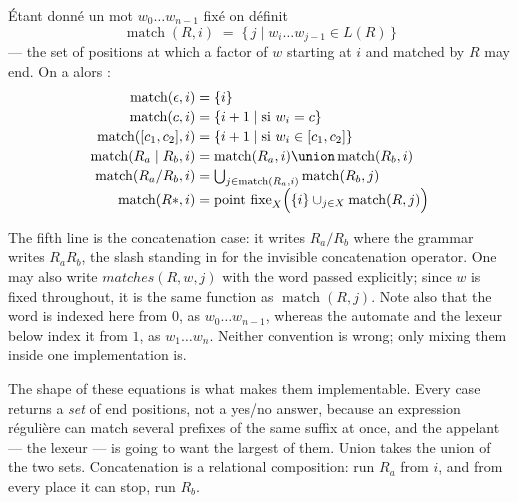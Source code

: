 \begin{definition}
  Étant donné un mot $w_0 \ldots w_{n-1}$ fixé on définit
  \[
    \operatorname{match}(R, i) \;=\; \{\, j \mid w_i \ldots w_{j-1} \in L(R) \,\}
  \]
  --- the set of positions at which a factor of $w$ starting at $i$ and matched
  by $R$ may end. On a alors :
  \[
    \begin{array}{r@{\;}c@{\;}l}
      \operatorname{match}(\epsilon, i)      &=& \{i\} \\[2pt]
      \operatorname{match}(c, i)             &=& \{ i+1 \mid \text{si } w_i = c \} \\[2pt]
      \operatorname{match}([c_1, c_2], i)    &=& \{ i+1 \mid \text{si } w_i \in [c_1, c_2] \} \\[2pt]
      \operatorname{match}(R_a \mid R_b, i)  &=& \operatorname{match}(R_a, i) \union \operatorname{match}(R_b, i) \\[2pt]
      \operatorname{match}(R_a / R_b, i)     &=& \bigcup_{j \in \operatorname{match}(R_a, i)} \operatorname{match}(R_b, j) \\[2pt]
      \operatorname{match}(R{*}, i)          &=& \text{point fixe}_X \Big( \{i\} \cup_{j \in X} \operatorname{match}(R, j) \Big)
    \end{array}
  \]
\end{definition}

\begin{notation}
  The fifth line is the concatenation case: it writes $R_a / R_b$ where the
  grammar writes $R_a R_b$, the slash standing in for the invisible
  concatenation operator. One may also write $\mathit{matches}(R, w, j)$ with
  the word passed explicitly; since $w$ is fixed throughout, it is the same
  function as $\operatorname{match}(R, j)$. Note also that the word is indexed
  here from $0$, as $w_0 \ldots w_{n-1}$, whereas the automate and the lexeur
  below index it from $1$, as $w_1 \ldots w_n$. Neither convention is wrong;
  only mixing them inside one implementation is.
\end{notation}

The shape of these equations is what makes them implementable. Every case
returns a \emph{set} of end positions, not a yes/no answer, because an
expression régulière can match several prefixes of the same suffix at once, and the appelant
--- the lexeur --- is going to want the largest of them. Union takes the union
of the two sets. Concatenation is a relational composition: run $R_a$ from $i$,
and from every place it can stop, run $R_b$.


